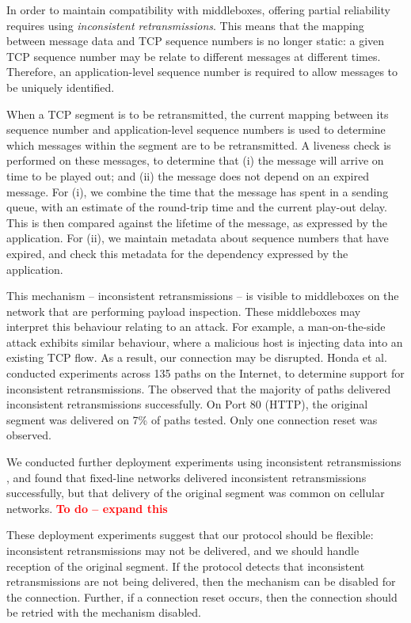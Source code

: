 \documentclass{sig-alternate-05-2015}
\newcommand{\todo}[1]{\textbf{\textcolor{red}{To do -- #1}}}
\begin{document}
In order to maintain compatibility with middleboxes, offering partial
reliability requires using \emph{inconsistent retransmissions}. This means
that the mapping between message data and TCP sequence numbers is no longer
static: a given TCP sequence number may be relate to different messages at
different times. Therefore, an application-level sequence number is
required to allow messages to be uniquely identified.

When a TCP segment is to be retransmitted, the current mapping between its
sequence number and application-level sequence numbers is used to determine
which messages within the segment are to be retransmitted. A liveness check
is performed on these messages, to determine that (i) the message will
arrive on time to be played out; and (ii) the message does not depend on an
expired message. For (i), we combine the time that the message has spent in
a sending queue, with an estimate of the round-trip time and the current
play-out delay. This is then compared against the lifetime of the message,
as expressed by the application. For (ii), we maintain metadata about
sequence numbers that have expired, and check this metadata for the
dependency expressed by the application.

This mechanism -- inconsistent retransmissions -- is visible to middleboxes
on the network that are performing payload inspection. These middleboxes
may interpret this behaviour relating to an attack. For example, a
man-on-the-side attack exhibits similar behaviour, where a malicious host
is injecting data into an existing TCP flow. As a result, our connection
may be disrupted. Honda et al. \cite{honda:2011:extend-tcp} conducted
experiments across 135 paths on the Internet, to determine support for
inconsistent retransmissions. The observed that the majority of paths
delivered inconsistent retransmissions successfully. On Port 80 (HTTP), the
original segment was delivered on 7\% of paths tested. Only one connection
reset was observed. 

We conducted further deployment experiments using
inconsistent retransmissions \cite{mcquistin2016hollywood}, and found that
fixed-line networks delivered inconsistent retransmissions successfully,
but that delivery of the original segment was common on cellular networks.
\todo{expand this}

These deployment experiments suggest that our protocol should be
flexible: inconsistent retransmissions may not be delivered, and we should
handle reception of the original segment. If the protocol detects that
inconsistent retransmissions are not being delivered, then the mechanism
can be disabled for the connection. Further, if a connection reset occurs,
then the connection should be retried with the mechanism disabled.
\end{document}
